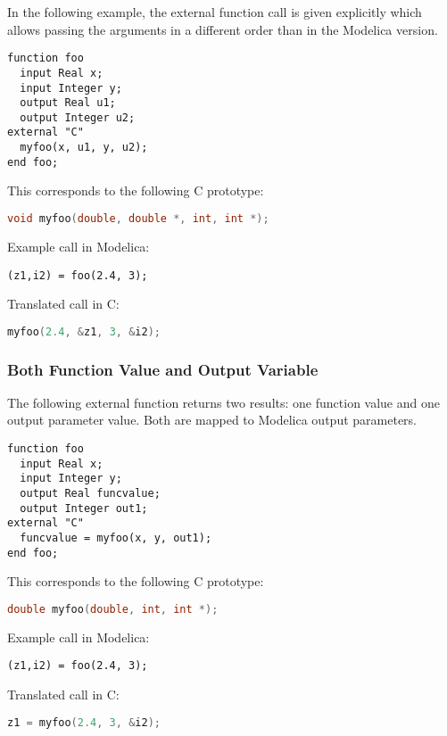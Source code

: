 \begin{example}
In the following example, the external function call is given explicitly which allows passing the arguments in a different order than in the Modelica version.
\begin{lstlisting}[language=modelica]
function foo
  input Real x;
  input Integer y;
  output Real u1;
  output Integer u2;
external "C"
  myfoo(x, u1, y, u2);
end foo;
\end{lstlisting}
This corresponds to the following C prototype:
\begin{lstlisting}[language=C]
void myfoo(double, double *, int, int *);
\end{lstlisting}
Example call in Modelica:
\begin{lstlisting}[language=modelica]
(z1,i2) = foo(2.4, 3);
\end{lstlisting}
Translated call in C:
\begin{lstlisting}[language=C]
myfoo(2.4, &z1, 3, &i2);
\end{lstlisting}
\end{example}

\subsubsection{Both Function Value and Output Variable}\label{external-function-with-both-function-value-and-output-variable}\label{both-function-value-and-output-variable}

\begin{example}
The following external function returns two results: one function value and one output parameter value.
Both are mapped to Modelica output parameters.
\begin{lstlisting}[language=modelica]
function foo
  input Real x;
  input Integer y;
  output Real funcvalue;
  output Integer out1;
external "C"
  funcvalue = myfoo(x, y, out1);
end foo;
\end{lstlisting}
This corresponds to the following C prototype:
\begin{lstlisting}[language=C]
double myfoo(double, int, int *);
\end{lstlisting}
Example call in Modelica:
\begin{lstlisting}[language=modelica]
(z1,i2) = foo(2.4, 3);
\end{lstlisting}
Translated call in C:
\begin{lstlisting}[language=C]
z1 = myfoo(2.4, 3, &i2);
\end{lstlisting}
\end{example}

